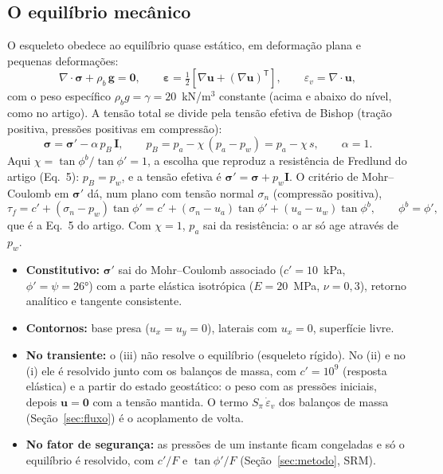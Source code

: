 \documentclass[11pt,a4paper]{article}
\begin{document}
\subsection{O equilíbrio mecânico}\label{sec:equil}
O esqueleto obedece ao equilíbrio quase estático, em deformação plana e pequenas deformações:
\begin{equation}
\nabla\!\cdot\boldsymbol\sigma + \rho_b\,\mathbf g = \mathbf 0,\qquad
\boldsymbol\varepsilon = \tfrac12\left[\nabla\mathbf u + (\nabla\mathbf u)^{\mathsf T}\right],\qquad
\varepsilon_v = \nabla\!\cdot\mathbf u,
\end{equation}
com o peso específico $\rho_b g = \gamma = 20$~kN/m$^3$ constante (acima e abaixo do nível, como no artigo). A tensão
total se divide pela tensão efetiva de Bishop (tração positiva, pressões positivas em compressão):
\begin{equation}
\boldsymbol\sigma = \boldsymbol\sigma' - \alpha\,p_B\,\mathbf I,\qquad
p_B = p_a - \chi\,(p_a - p_w) = p_a - \chi\,s,\qquad \alpha = 1.
\end{equation}
Aqui $\chi = \tan\phi^b/\tan\phi' = 1$, a escolha que reproduz a resistência de Fredlund do artigo (Eq.~5):
$p_B = p_w$, e a tensão efetiva é $\boldsymbol\sigma' = \boldsymbol\sigma + p_w\mathbf I$. O critério de Mohr--Coulomb em
$\boldsymbol\sigma'$ dá, num plano com tensão normal $\sigma_n$ (compressão positiva),
\begin{equation}
\tau_f = c' + (\sigma_n - p_w)\tan\phi' = c' + (\sigma_n - u_a)\tan\phi' + (u_a - u_w)\tan\phi^b,
\qquad \phi^b = \phi',
\end{equation}
que é a Eq.~5 do artigo. Com $\chi = 1$, $p_a$ sai da resistência: o ar só age através de $p_w$.
\begin{itemize}
  \item \textbf{Constitutivo:} $\boldsymbol\sigma'$ sai do Mohr--Coulomb associado ($c' = 10$~kPa, $\phi' = \psi =
    26°$) com a parte elástica isotrópica ($E = 20$~MPa, $\nu = 0{,}3$), retorno analítico e tangente consistente.
  \item \textbf{Contornos:} base presa ($u_x = u_y = 0$), laterais com $u_x = 0$, superfície livre.
  \item \textbf{No transiente:} o (iii) não resolve o equilíbrio (esqueleto rígido). No (ii) e no (i) ele é resolvido
    junto com os balanços de massa, com $c' = 10^9$ (resposta elástica) e a partir do estado geostático: o peso com as
    pressões iniciais, depois $\mathbf u = \mathbf 0$ com a tensão mantida. O termo $S_\pi\,\dot\varepsilon_v$ dos
    balanços de massa (Seção~\ref{sec:fluxo}) é o acoplamento de volta.
  \item \textbf{No fator de segurança:} as pressões de um instante ficam congeladas e só o equilíbrio é resolvido, com
    $c'/F$ e $\tan\phi'/F$ (Seção~\ref{sec:metodo}, SRM).
\end{itemize}
\end{document}
